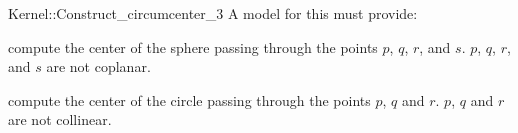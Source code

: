 \begin{ccRefFunctionObjectConcept}{Kernel::Construct_circumcenter_3}
A model for this must provide:


 {compute the center of the sphere passing through the points $p$, $q$, $r$,
  and $s$.  \ccPrecond $p$, $q$, $r$, and $s$ are not coplanar.}

{compute the center of the circle passing through the points $p$, $q$ and $r$.
  \ccPrecond $p$, $q$ and $r$ are not collinear.}

\end{ccRefFunctionObjectConcept}
